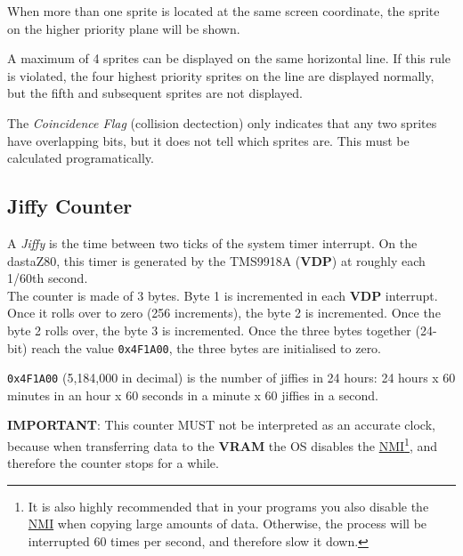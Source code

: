     When more than one sprite is located at the same screen coordinate, the
    sprite on the higher priority plane will be shown.

    A maximum of 4 sprites can be displayed on the same horizontal line. If this
    rule is violated, the four highest priority sprites on the line are
    displayed normally, but the fifth and subsequent sprites are not displayed.

    The \textit{Coincidence Flag} (collision dectection) only indicates that
    any two sprites have overlapping bits, but it does not tell which sprites
    are. This must be calculated programatically.

    \subsection{Jiffy Counter}
    \label{subsec:jiffy_counter}

    A \textit{Jiffy} is the time between two ticks of the system timer interrupt.
    On the dastaZ80, this timer is generated by the TMS9918A (\textbf{VDP}) at
    roughly each 1/60th second.\\

    The counter is made of 3 bytes. Byte 1 is incremented in each \textbf{VDP}
    interrupt. Once it rolls over to zero (256 increments), the byte 2 is
    incremented. Once the byte 2 rolls over, the byte 3 is incremented. Once the
    three bytes together (24-bit) reach the value \texttt{0x4F1A00}, the three
    bytes are initialised to zero.

    \texttt{0x4F1A00} (5,184,000 in decimal) is the number of jiffies in 24
    hours: 24 hours x 60 minutes in an hour x 60 seconds in a minute x 60
    jiffies in a second.

    \textbf{IMPORTANT}: This counter MUST not be interpreted as an accurate
    clock, because when transferring data to the \textbf{VRAM} the OS disables
    the \hyperref[sec:nmi]{NMI}\footnote{It is also highly recommended that in
    your programs you also disable the \hyperref[sec:nmi]{NMI} when copying
    large amounts of data. Otherwise, the process will be interrupted 60 times
    per second, and therefore slow it down.}, and therefore the counter stops
    for a while.

